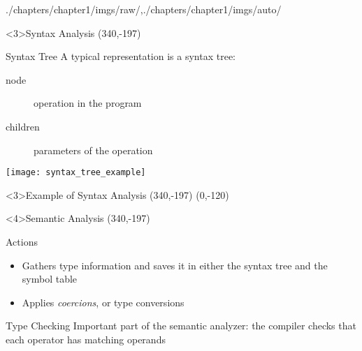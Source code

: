 \begin{graphicspathcontext}{{./chapters/chapter1/imgs/raw/},{./chapters/chapter1/imgs/auto/}}
\begin{bibunit}[apalike]
\begin{frame}<3>{Syntax Analysis}
	\putat*(340,-197){}
	\begin{minipage}{.8\linewidth}
		\vspace{.5cm}
		\begin{block}{Syntax Tree}
			A typical representation is a syntax tree: \begin{description}
			\item[node] operation in the program
			\item[children] parameters of the operation
			\end{description}
			\vspace{1em}
			\texttt{[image: syntax\_tree\_example]}
		\end{block}
	\end{minipage}
\end{frame}

\begin{frame}<3>{Example of Syntax Analysis}
	\putat*(340,-197){}
	\putat(0,-120){}
\end{frame}

\begin{frame}<4>{Semantic Analysis}
	\putat*(340,-197){}
	\begin{minipage}{.8\linewidth}
		\vspace{.25cm}
		\begin{block}{Actions}
			\begin{itemize}
			\item Gathers type information and saves it in either the syntax tree and the symbol table
			\item Applies \emph{coercions}, or type conversions
			\end{itemize}
		\end{block}
		\vspace{.25cm}
		\begin{alertblock}{Type Checking}
			Important part of the semantic analyzer: the compiler checks that each operator has matching operands
		\end{alertblock}
	\end{minipage}
\end{frame}


\end{bibunit}
\end{graphicspathcontext}

